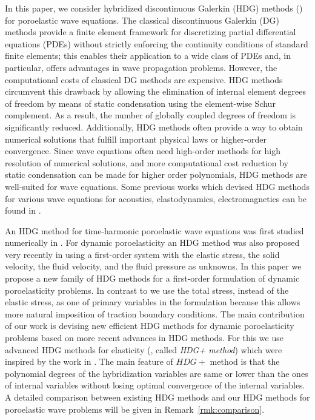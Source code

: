 \documentclass[10pt,letterpaper]{amsart}
\theoremstyle{plain} %
\theoremstyle{remark} %
\begin{document}
In this paper, we consider hybridized discontinuous Galerkin (HDG) methods (\cite{Cockburn:2009a}) for poroelastic wave equations. The classical discontinuous Galerkin (DG) methods provide a finite element framework for discretizing partial differential equations (PDEs) without strictly enforcing the continuity conditions of standard finite elements; this enables their application to a wide class of PDEs and, in particular, offers advantages in wave propagation problems. However,  the computational costs of classical DG methods are expensive. HDG methods circumvent this drawback by allowing the elimination of internal element degrees of freedom by means of static condensation using the element-wise Schur complement. As a result, the number of globally coupled degrees of freedom is significantly reduced. Additionally, HDG methods often provide a way to obtain numerical solutions that fulfill important physical laws or higher-order convergence. Since wave equations often need high-order methods for high resolution of numerical solutions, and more computational cost reduction by static condensation can be made for higher order polynomials, HDG methods are well-suited for wave equations. Some previous works which devised HDG methods for various wave equations for acoustics, elastodynamics, electromagnetics can be found in \cite{Cockburn-Quenneville:2014,Nguyen-Peraire:2016,Cockburn-Fu-Sanchez-Sayas:2018,Sanchez-Du-Cockburn-Nguyen-Peraire:2022,Fernandez-Nguyen-Peraire:2018,Sanchez-Nguyen-Peraire:2017,Sanchez-Cockburn-Nguyen-Peraire:2021,Cockburn-Du-Sanchez:2023,Lee-Bolanos:2025}. 

An HDG method for time-harmonic poroelastic wave equations was first studied numerically in \cite{Barucq:2021}. For dynamic poroelasticity an HDG method was also proposed very recently in \cite{Meddahi-poroelastodynamic:2025} using a first-order system with the elastic stress, the solid velocity, the fluid velocity, and the fluid pressure as unknowns. In this paper we propose a new family of HDG methods for a first-order formulation of dynamic poroelasticity problems. In contrast to \cite{Meddahi-poroelastodynamic:2025} we use the total stress, instead of the elastic stress, as one of primary variables in the formulation because this allows more natural imposition of traction boundary conditions. The main contribution of our work is devising new efficient HDG methods for dynamic poroelasticity problems based on more recent advances in HDG methods. For this we use advanced HDG methods for elasticity (\cite{Qiu-Shen-Shi:2018,Du-Sayas:2020a,Du-Sayas:2021}, called {\it HDG+ method}) which were inspired by the work in \cite{Lehrenfeld-Schoberl:2016,Oikawa:2015,Oikawa:2016}. The main feature of $HDG+$ method is that the polynomial degrees of the hybridization variables are same or lower than the ones of internal variables without losing optimal convergence of the internal variables. A detailed comparison between existing HDG methods and our HDG methods for poroelastic wave problems will be given in Remark~\ref{rmk:comparison}. %
\end{document}
